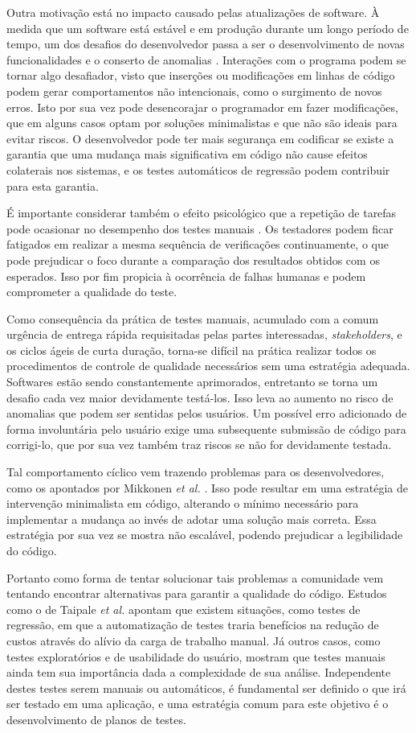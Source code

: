 Outra motivação está no impacto causado pelas atualizações de software. À medida que um software está estável e em produção durante um longo período de tempo, um dos desafios do desenvolvedor passa a ser o desenvolvimento de novas funcionalidades e o conserto de anomalias \cite{gupta}. Interações com o programa podem se tornar algo desafiador, visto que inserções ou modificações em linhas de código podem gerar comportamentos não intencionais, como o surgimento de novos erros. Isto por sua vez pode desencorajar o programador em fazer modificações, que em alguns casos optam por soluções minimalistas e que não são ideais para evitar riscos. O desenvolvedor pode ter mais segurança em codificar se existe a garantia que uma mudança mais significativa em código não cause efeitos colaterais nos sistemas, e os testes automáticos de regressão podem contribuir para esta garantia.

É importante considerar também o efeito psicológico que a repetição de tarefas pode ocasionar no desempenho dos testes manuais \cite{desikan}. Os testadores podem ficar fatigados em realizar a mesma sequência de verificações continuamente, o que pode prejudicar o foco durante a comparação dos resultados obtidos com os esperados. Isso por fim propicia à ocorrência de falhas humanas e podem comprometer a qualidade do teste.

Como consequência da prática de testes manuais, acumulado com a comum urgência de entrega rápida requisitadas pelas partes interessadas, \emph{stakeholders}, e os ciclos ágeis de curta duração, torna-se difícil na prática realizar todos os procedimentos de controle de qualidade necessários sem uma estratégia adequada. Softwares estão sendo constantemente aprimorados, entretanto se torna um desafio cada vez maior devidamente testá-los. Isso leva ao aumento no risco de anomalias que podem ser sentidas pelos usuários. Um possível erro adicionado de forma involuntária pelo usuário exige uma subsequente submissão de código para corrigi-lo, que por sua vez também traz riscos se não for devidamente testada.

Tal comportamento cíclico vem trazendo problemas para os desenvolvedores, como os apontados por Mikkonen \emph{et al.} \cite{mikkonen}. Isso pode resultar em uma estratégia de intervenção minimalista em código, alterando o mínimo necessário para implementar a mudança ao invés de adotar uma solução mais correta. Essa estratégia por sua vez se mostra não escalável, podendo prejudicar a legibilidade do código.

Portanto como forma de tentar solucionar tais problemas a comunidade vem tentando encontrar alternativas para garantir a qualidade do código. Estudos como o de Taipale \emph{et al.} \cite{taipale} apontam que existem situações, como testes de regressão, em que a automatização de testes traria benefícios na redução de custos através do alívio da carga de trabalho manual. Já outros casos, como testes exploratórios e de usabilidade do usuário, mostram que testes manuais ainda tem sua importância dada a complexidade de sua análise. Independente destes testes serem manuais ou automáticos, é fundamental ser definido o que irá ser testado em uma aplicação, e uma estratégia comum para este objetivo é o desenvolvimento de planos de testes.


